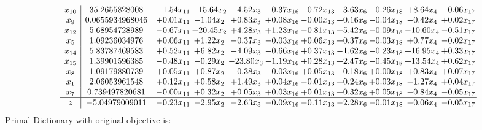 \documentclass[9pt]{article}
\begin{document}
\[\begin{array}{c| c c@{\hskip 2pt} c@{\hskip 2pt} c@{\hskip 2pt} c@{\hskip 2pt} c@{\hskip 2pt} c@{\hskip 2pt} c@{\hskip 2pt} c@{\hskip 2pt} c@{\hskip 2pt} }
 x_{10}   &  35.2655828008 & -1.54 x_{11} & -15.64 x_{2} & -4.52 x_{3} & -0.37 x_{16} & -0.72 x_{13} & -3.63 x_{6} & -0.26 x_{18} & +  8.64 x_{4} & -0.06 x_{17}\\
 x_{9}   &  0.0655934968046 & +  0.01 x_{11} & -1.04 x_{2} & +  0.83 x_{3} & +  0.08 x_{16} & -0.00 x_{13} & +  0.16 x_{6} & -0.04 x_{18} & -0.42 x_{4} & +  0.02 x_{17}\\
 x_{12}   &  5.68954728989 & -0.67 x_{11} & -20.45 x_{2} & +  4.28 x_{3} & +  1.23 x_{16} & -0.81 x_{13} & +  5.42 x_{6} & -0.09 x_{18} & -10.60 x_{4} & -0.51 x_{17}\\
 x_{5}   &  1.09236034976 & +  0.06 x_{11} & +  1.22 x_{2} & -0.37 x_{3} & -0.03 x_{16} & +  0.06 x_{13} & +  0.37 x_{6} & -0.03 x_{18} & +  0.77 x_{4} & -0.02 x_{17}\\
 x_{14}   &  5.83787469583 & +  0.52 x_{11} & +  6.82 x_{2} & -4.09 x_{3} & -0.66 x_{16} & +  0.37 x_{13} & -1.62 x_{6} & -0.23 x_{18} & + 16.95 x_{4} & +  0.33 x_{17}\\
 x_{15}   &  1.39901596385 & -0.48 x_{11} & -0.29 x_{2} & -23.80 x_{3} & -1.19 x_{16} & +  0.28 x_{13} & +  2.47 x_{6} & -0.45 x_{18} & + 13.54 x_{4} & +  0.62 x_{17}\\
 x_{8}   &  1.09179880739 & +  0.05 x_{11} & +  0.87 x_{2} & -0.38 x_{3} & -0.03 x_{16} & +  0.05 x_{13} & +  0.18 x_{6} & +  0.00 x_{18} & +  0.83 x_{4} & +  0.07 x_{17}\\
 x_{1}   &  2.06053961548 & +  0.12 x_{11} & +  0.58 x_{2} & +  1.49 x_{3} & +  0.04 x_{16} & -0.01 x_{13} & +  0.24 x_{6} & +  0.03 x_{18} & -1.27 x_{4} & +  0.04 x_{17}\\
 x_{7}   &  0.739497820681 & -0.00 x_{11} & +  0.32 x_{2} & +  0.05 x_{3} & +  0.03 x_{16} & +  0.01 x_{13} & +  0.32 x_{6} & +  0.05 x_{18} & -0.84 x_{4} & -0.05 x_{17}\\
\hline
z    &  -5.04979009011 & -0.23 x_{11} & -2.95 x_{2} & -2.63 x_{3} & -0.09 x_{16} & -0.11 x_{13} & -2.28 x_{6} & -0.01 x_{18} & -0.06 x_{4} & -0.05 x_{17}\\
\end{array}\]
Primal Dictionary with original objective is:
\end{document}
